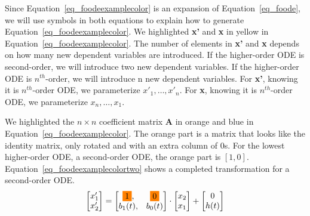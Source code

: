 Since Equation~\ref{eq_foodeexamplecolor} is an expansion of Equation~\ref{eq_foode}, we will use symbols in both equations to explain how to generate Equation~\ref{eq_foodeexamplecolor}. We highlighted \textbf{x'} and \textbf{x} in yellow in Equation~\ref{eq_foodeexamplecolor}. The number of elements in \textbf{x'} and \textbf{x} depends on how many new dependent variables are introduced. If the higher-order ODE is second-order, we will introduce two new dependent variables. If the higher-order ODE is $n^{th}$-order, we will introduce n new dependent variables. For \textbf{x'}, knowing it is $n^{th}$-order ODE, we parameterize $x'_{1}, \dots, x'_{n}$. For \textbf{x}, knowing it is $n^{th}$-order ODE, we parameterize $x_{n}, \dots, x_{1}$.

We highlighted the $n \times n$ coefficient matrix \textbf{A} in orange and blue in Equation~\ref{eq_foodeexamplecolor}. The orange part is a matrix that looks like the identity matrix, only rotated and with an extra column of 0s. For the lowest higher-order ODE, a second-order ODE, the orange part is $[1, 0]$. Equation~\ref{eq_foodeexamplecolortwo} shows a completed transformation for a second-order ODE.
\begin{equation} \label{eq_foodeexamplecolortwo}
	\begin{bmatrix}
		{x_{1}'} \\
    {x_{2}'} 
	\end{bmatrix}
    = 
  \begin{bmatrix}
		\highlight{orange}{1}, & \highlight{orange}{0} \\
    {b_{1}(t)}, & {b_{0}(t)}
	\end{bmatrix}
    \cdot
  \begin{bmatrix}
		{x_{2}} \\
    {x_{1}} 
	\end{bmatrix}
    + 
  \begin{bmatrix}
    {0} \\
    {h(t)}
	\end{bmatrix}
\end{equation}

